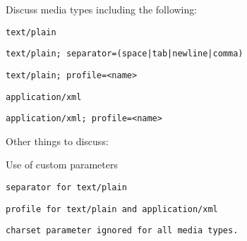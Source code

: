 
Discuss media types including the following:
\begin{enum}
	\item \tt{text/plain}
	\item \tt{text/plain; separator=(space|tab|newline|comma)}
	\item \tt{text/plain; profile=<name>}
	\item \tt{application/xml}
	\item \tt{application/xml; profile=<name>}
\end{enum}

Other things to discuss:
\begin{enum}
	\item Use of custom parameters
	\begin{enum}
		\item \tt{separator} for \tt{text/plain}
		\item \tt{profile} for \tt{text/plain} and \tt{application/xml}
	\end{enum}
	\item \tt{charset} parameter ignored for all media types.
\end{enum}


